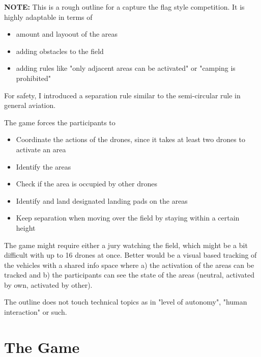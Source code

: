 
\newpage

\begin{note}
\textbf{NOTE:} This is a rough outline for a capture the flag style competition. It is highly adaptable in terms of
\begin{itemize}
    \item {amount and layoout of the areas}
    \item {adding obstacles to the field}
    \item {adding rules like "only adjacent areas can be activated" or "camping is prohibited"}
\end{itemize}

\vspace{5mm}
For safety, I introduced a separation rule similar to the semi-circular rule in general aviation.

\vspace{5mm}
The game forces the participants to
\begin{itemize}
    \item {Coordinate the actions of the drones, since it takes at least two drones to activate an area}
    \item {Identify the areas}
    \item {Check if the area is occupied by other drones}
    \item {Identify and land designated landing pads on the areas}
    \item {Keep separation when moving over the field by staying within a certain height}
\end{itemize}

\vspace{5mm}
The game might require either a jury watching the field, which might be a bit difficult with up to 16 drones at once. Better would be a visual based tracking of the vehicles with a shared info space where a) the activation of the areas can be tracked and b) the participants can see the state of the areas (neutral, activated by own, activated by other).

\vspace{5mm}
The outline does not touch technical topics as in "level of autonomy", "human interaction" or such.
\end{note}
    
\newpage

\section{The Game}

